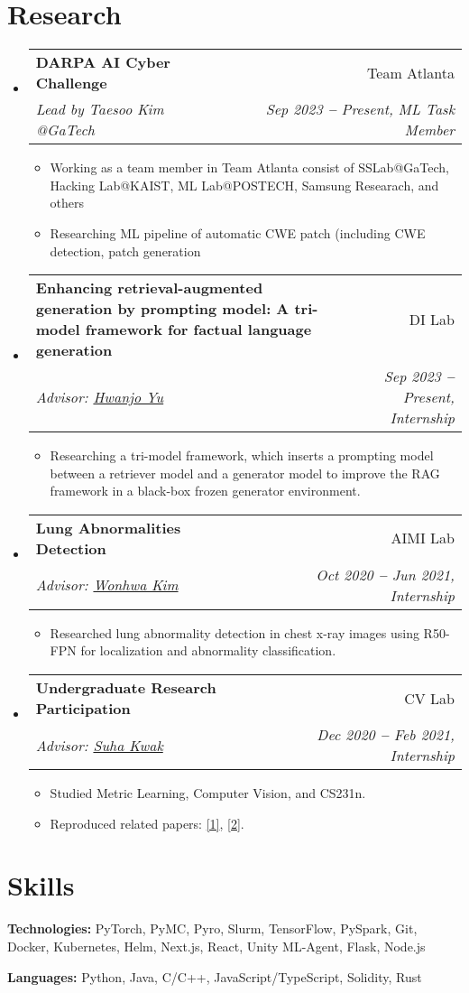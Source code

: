 \documentclass[letterpaper,11pt]{article}
\newcommand{\resumeItem}[1]{
  \item\small{
    {#1 \vspace{-2pt}}
  }
}
\newcommand{\resumeSubheading}[4]{
  \vspace{-2pt}\item
    \begin{tabularx}{0.97\textwidth}[t]{Xr}
      \textbf{#1} & #2 \\
      \textit{\small#3} & \textit{\small #4} \\
    \end{tabularx}\vspace{-7pt}
}
\newcommand{\resumeSubHeadingListStart}{\begin{itemize}[leftmargin=0.15in, label={}]}
\newcommand{\resumeSubHeadingListEnd}{\end{itemize}}
\newcommand{\resumeItemListStart}{\begin{itemize}}
\newcommand{\resumeItemListEnd}{\end{itemize}\vspace{-5pt}}
\begin{document}
\section{Research}
  \vspace{3pt}
  \resumeSubHeadingListStart
    \resumeSubheading
        {DARPA AI Cyber Challenge}
        {Team Atlanta}
        {Lead by Taesoo Kim @GaTech}
        {Sep 2023 \textbf{--} Present, ML Task Member}
            \resumeItemListStart
                \resumeItem{Working as a team member in Team Atlanta consist of SSLab@GaTech, Hacking Lab@KAIST, ML Lab@POSTECH, Samsung Researach, and others}
                \resumeItem{Researching ML pipeline of automatic CWE patch (including CWE detection, patch generation}
            \resumeItemListEnd
    \resumeSubheading
      {Enhancing retrieval-augmented generation by prompting model: A tri-model framework for factual language generation}
      {DI Lab}
      {Advisor: \href{https://sites.google.com/view/postechdi/member/faculty}{Hwanjo Yu}}
      {Sep 2023 \textbf{--} Present, Internship}
        \resumeItemListStart
            \resumeItem{Researching a tri-model framework, which inserts a prompting model between a retriever model and a generator model to improve the RAG framework in a black-box frozen generator environment.}
        \resumeItemListEnd
    
    \resumeSubheading
      {Lung Abnormalities Detection}
      {AIMI Lab}
      {Advisor: \href{https://miv.postech.ac.kr/members/}{Wonhwa Kim}}
      {Oct 2020 \textbf{--} Jun 2021, Internship}
        \resumeItemListStart
            \resumeItem{Researched lung abnormality detection in chest x-ray images using R50-FPN for localization and abnormality classification.}
        \resumeItemListEnd

    \resumeSubheading
        {Undergraduate Research Participation}
        {CV Lab}
        {Advisor: \href{https://suhakwak.github.io/index.html}{Suha Kwak}}
        {Dec 2020 \textbf{--} Feb 2021, Internship}
        \resumeItemListStart
            \resumeItem{Studied Metric Learning, Computer Vision, and CS231n.}
            \resumeItem{Reproduced related papers: \href{https://arxiv.org/abs/1805.08974}{[1]}, \href{https://arxiv.org/abs/2010.01412}{[2]}.}

        \resumeItemListEnd
    
  \resumeSubHeadingListEnd


\section{Skills}
  \vspace{2pt}
  \resumeSubHeadingListStart
    \small{\item{
        \textbf{Technologies:} {PyTorch, PyMC, Pyro, Slurm, TensorFlow, PySpark, Git, Docker, Kubernetes, Helm, Next.js, React, Unity ML-Agent, Flask, Node.js }
        
        \textbf{Languages:} {Python, Java, C/C++, JavaScript/TypeScript, Solidity, Rust} \\ \vspace{3pt}
    }}
  \resumeSubHeadingListEnd
  
\end{document}
